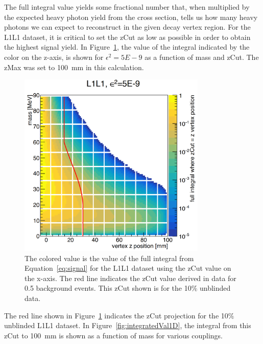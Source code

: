 The full integral value yields some fractional number that, when multiplied by the expected heavy photon yield from the cross section, tells us how many heavy photons we can expect to reconstruct in the given decay vertex region. For the L1L1 dataset, it is critical to set the zCut as low as possible in order to obtain the highest signal yield. In Figure~\ref{fig:integratedVal2D}, the value of the integral indicated by the color on the z-axis, is shown for $\epsilon^{2} = 5E-9$ as a function of mass and zCut. The zMax was set to 100~mm in this calculation. 

\begin{figure}[H]
  \centering
      \includegraphics[width=0.8\textwidth]{plots/L1L1_eff_mz.png}
  \caption{The colored value is the value of the full integral from Equation~\eqref{eq:signal} for the L1L1 dataset using the zCut value on the x-axis. The red line indicates the zCut value derived in data for 0.5 background events. This zCut shown is for the 10$\%$ unblinded data.}
  \label{fig:integratedVal2D}
\end{figure} 

The red line shown in Figure~\ref{fig:integratedVal2D} indicates the zCut projection for the 10$\%$ unblinded L1L1 dataset. In Figure~\ref{fig:integratedVal1D}, the integral from this zCut to 100~mm is shown as a function of mass for various couplings. 

